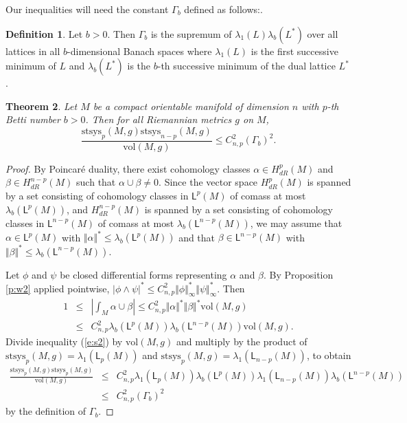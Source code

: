 \documentclass[12pt]{amsart}
\newtheorem{theorem}{Theorem}[section]
\theoremstyle{definition}
\newtheorem{definition}[theorem]{Definition}
\theoremstyle{remark}
\numberwithin{equation}{section}
\begin{document}
Our inequalities will need the constant $\Gamma_b$ defined as follows:. 

\begin{definition} Let $b>0$. Then $\Gamma_b$ 
is the supremum of $\lambda_1(L) \lambda_b(L^\ast) $ over all lattices in all $b$-dimensional Banach spaces where $\lambda_1(L)$ is the first successive minimum of $L$ and  $\lambda_b(L^\ast)$ is the $b$-th successive minimum of the dual lattice $L^\ast$.
\end{definition}

\begin{theorem}\label{t:s2}%
Let $M$ be a compact orientable manifold of dimension $n$ with $p$-th Betti number $b >0$.  Then for all Riemannian metrics $g$ on $M$,
\begin{equation*}\frac {\mathrm{stsys}_p(M,g)\mathrm{stsys}_{n-p}(M,g)}{\mathrm{vol}(M,g)} \leq C_{n,p}^2 (\Gamma_b)^2.
\end{equation*}
\end{theorem}
\begin{proof}
By Poincar\'e duality, there exist cohomology classes $\alpha \in H^p_{dR}(M)$ and $\beta \in H^{n-p}_{dR}(M)$ such that $\alpha \cup \beta \neq 0$. Since 
the vector space $H^p_{dR}(M)$ is spanned by a set 
consisting of cohomology classes in $\mathsf{L}^p(M)$ of comass at most $\lambda_b(\mathsf{L}^p(M))$,  and $H^{n-p}_{dR}(M)$ is spanned by a set consisting of cohomology classes in $\mathsf{L}^{n-p}(M)$ of comass at most $\lambda_b(\mathsf{L}^{n-p}(M))$,
we may assume that  $\alpha \in \mathsf{L}^p(M)$ with $\Vert \alpha \Vert^\ast \leq \lambda_b(\mathsf{L}^p(M))$ and that $\beta \in \mathsf{L}^{n-p}(M)$ with  $\Vert \beta \Vert^\ast \leq \lambda_b(\mathsf{L}^{n-p}(M))$.



Let $\phi$ and $\psi$ be closed differential forms representing $\alpha$ and $\beta$.
By Proposition \ref{p:w2} applied pointwise, $|\phi\wedge \psi|^\ast \leq C_{n,p}^2\Vert \phi \Vert_\infty^\ast \Vert \psi\Vert_\infty^\ast$. Then
\begin{eqnarray}\label{e:s2}
1 &\leq& \left| \int_M \alpha \cup \beta \right| \leq C_{n,p}^2\Vert \alpha \Vert^\ast \Vert \beta\Vert^\ast \mathrm{vol}(M,g) \\
&\leq& C_{n,p}^2 \lambda_b(\mathsf{L}^p(M)) \lambda_b(\mathsf{L}^{n-p}(M)) \mathrm{vol}(M,g).
\end{eqnarray}
Divide inequality (\ref{e:s2}) by $\mathrm{vol}(M,g)$ and multiply  by the product of
 $\mathrm{stsys}_p (M,g) = \lambda_1(\mathsf{L}_p(M))$ and $\mathrm{stsys}_p (M,g) = \lambda_1(\mathsf{L}_{n-p}(M))$, to obtain
 \begin{eqnarray*}
\frac{\mathrm{stsys}_p (M,g)\mathrm{stsys}_p (M,g)}{\mathrm{vol}(M,g)}&\leq & C_{n,p}^2 \lambda_1(\mathsf{L}_p(M))\lambda_b(\mathsf{L}^{p}(M))
 \lambda_1(\mathsf{L}_{n-p}(M))\lambda_b(\mathsf{L}^{n-p}(M))\\
 &\leq& C_{n,p}^2 (\Gamma_b)^2
\end{eqnarray*}
by the definition of $\Gamma_b$.
\end{proof}
\end{document}
